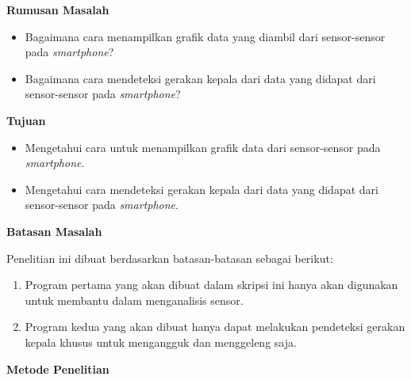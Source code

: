 \documentclass[a4paper,twoside]{article}
\begin{document}
\begin{enumerate}
\textbf{Rumusan Masalah}

\begin{itemize}
	\item Bagaimana cara menampilkan grafik data yang diambil dari sensor-sensor pada \textit{smartphone}?
	\item Bagaimana cara mendeteksi gerakan kepala dari data yang didapat dari sensor-sensor pada \textit{smartphone}?
\end{itemize}

\textbf{Tujuan}

\begin{itemize}
	\item Mengetahui cara untuk menampilkan grafik data dari sensor-sensor pada \textit{smartphone}.
	\item Mengetahui cara mendeteksi gerakan kepala dari data yang didapat dari sensor-sensor pada \textit{smartphone}.
\end{itemize}

\textbf{Batasan Masalah}

Penelitian ini dibuat berdasarkan batasan-batasan sebagai berikut: 
\begin{enumerate}
	\item Program pertama yang akan dibuat dalam skripsi ini hanya akan digunakan untuk membantu dalam menganalisis sensor.
	\item Program kedua yang akan dibuat hanya dapat melakukan pendeteksi gerakan kepala khusus untuk mengangguk dan menggeleng saja.
\end{enumerate}

\textbf{Metode Penelitian}


\end{enumerate}
\end{document}
